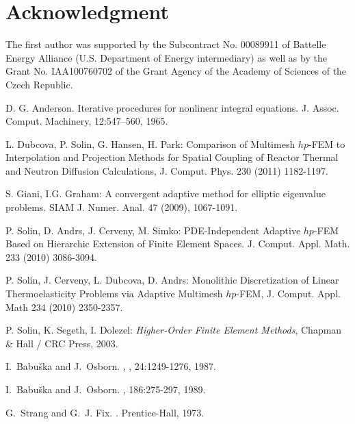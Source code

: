 \documentclass[preprint,12pt]{elsarticle}
\begin{document}
\section*{Acknowledgment}

The first author was supported by the Subcontract No. 00089911 of Battelle Energy
Alliance (U.S. Department of Energy intermediary) as well as by the Grant No. 
IAA100760702 of the Grant Agency of the Academy of Sciences of the Czech Republic.


\clearpage

\begin{thebibliography}{[KLR73]}

D. G. Anderson. Iterative procedures for nonlinear integral equations. J. Assoc. Comput.
Machinery, 12:547–560, 1965.

L. Dubcova, P. Solin, G. Hansen, H. Park: Comparison of Multimesh $hp$-FEM 
to Interpolation and Projection Methods for Spatial Coupling of Reactor 
Thermal and Neutron Diffusion Calculations, J. Comput. Phys. 230 (2011) 1182-1197.

S. Giani, I.G. Graham: A convergent adaptive method for elliptic eigenvalue 
problems. SIAM J. Numer. Anal. 47 (2009), 1067-1091.

P. Solin, D. Andrs, J. Cerveny, M. Simko: 
PDE-Independent Adaptive $hp$-FEM Based on Hierarchic Extension of Finite Element Spaces.
J. Comput. Appl. Math. 233 (2010) 3086-3094.

P. Solin, J. Cerveny, L. Dubcova, D. Andrs: Monolithic Discretization of Linear 
Thermoelasticity Problems via Adaptive Multimesh $hp$-FEM, J. Comput. Appl. Math 
234 (2010) 2350-2357.

P. Solin, K. Segeth, I. Dolezel: {\em Higher-Order Finite Element Methods},
Chapman \& Hall / CRC Press, 2003.

I.~Babu\v{s}ka and J.~Osborn.
, 
, 24:1249-1276, 1987.

I.~Babu\v{s}ka and J.~Osborn.
, 
 186:275-297, 1989.
 
G.~Strang and G.~J. Fix.
.
\newblock Prentice-Hall, 1973.


\end{thebibliography}
\end{document}
